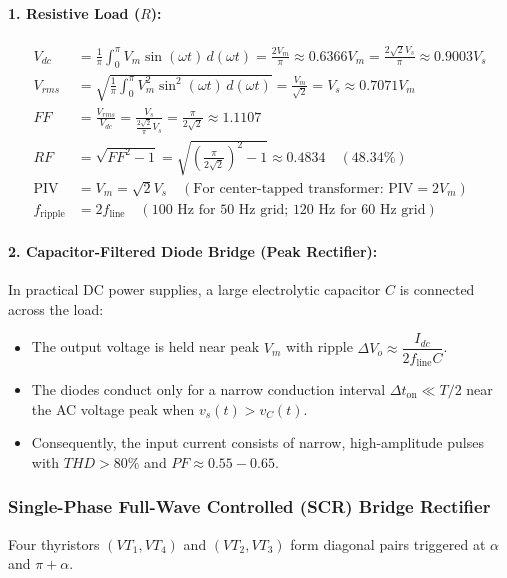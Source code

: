 \paragraph{1. Resistive Load ($R$):}
\begin{align}
V_{dc} &= \frac{1}{\pi}\int_0^\pi V_m \sin(\omega t)\,d(\omega t) = \frac{2 V_m}{\pi} \approx 0.6366 V_m = \frac{2\sqrt{2} V_s}{\pi} \approx 0.9003 V_s \\
V_{rms} &= \sqrt{\frac{1}{\pi}\int_0^\pi V_m^2 \sin^2(\omega t)\,d(\omega t)} = \frac{V_m}{\sqrt{2}} = V_s \approx 0.7071 V_m \\
FF &= \frac{V_{rms}}{V_{dc}} = \frac{V_s}{\frac{2\sqrt{2}}{\pi} V_s} = \frac{\pi}{2\sqrt{2}} \approx 1.1107 \\
RF &= \sqrt{FF^2 - 1} = \sqrt{\left(\frac{\pi}{2\sqrt{2}}\right)^2 - 1} \approx 0.4834 \quad (48.34\%) \\
\text{PIV} &= V_m = \sqrt{2} V_s \quad (\text{For center-tapped transformer: } \text{PIV} = 2V_m) \\
f_{\mathrm{ripple}} &= 2 f_{\mathrm{line}} \quad (100\text{ Hz for 50 Hz grid; } 120\text{ Hz for 60 Hz grid})
\end{align}

\paragraph{2. Capacitor-Filtered Diode Bridge (Peak Rectifier):}
In practical DC power supplies, a large electrolytic capacitor $C$ is connected across the load:
\begin{itemize}
  \item The output voltage is held near peak $V_m$ with ripple $\Delta V_o \approx \dfrac{I_{dc}}{2 f_{\mathrm{line}} C}$.
  \item The diodes conduct only for a narrow conduction interval $\Delta t_{\mathrm{on}} \ll T/2$ near the AC voltage peak when $v_s(t) > v_C(t)$.
  \item Consequently, the input current consists of narrow, high-amplitude pulses with $THD > 80\%$ and $PF \approx 0.55 - 0.65$.
\end{itemize}

\subsubsection{Single-Phase Full-Wave Controlled (SCR) Bridge Rectifier}
Four thyristors $(VT_1, VT_4)$ and $(VT_2, VT_3)$ form diagonal pairs triggered at $\alpha$ and $\pi + \alpha$.

